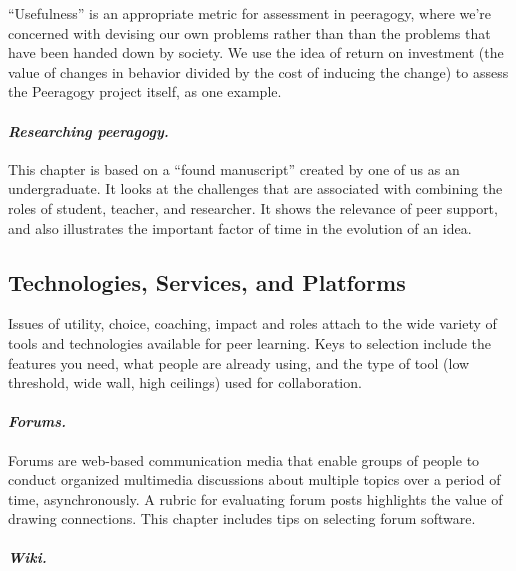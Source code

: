 ``Usefulness'' is an appropriate metric for assessment in peeragogy,
where we're concerned with devising our own problems rather than than
the problems that have been handed down by society. We use the idea of
return on investment (the value of changes in behavior divided by the
cost of inducing the change) to assess the Peeragogy project itself, as
one example.

\hypertarget{researching-peeragogy.}{%
\paragraph{\texorpdfstring{\emph{Researching
peeragogy.}}{Researching peeragogy.}}\label{researching-peeragogy.}}

This chapter is based on a ``found manuscript'' created by one of us as
an undergraduate. It looks at the challenges that are associated with
combining the roles of student, teacher, and researcher. It shows the
relevance of peer support, and also illustrates the important factor of
time in the evolution of an idea.

\hypertarget{technologies-services-and-platforms}{%
\subsection{Technologies, Services, and
Platforms}\label{technologies-services-and-platforms}}

Issues of utility, choice, coaching, impact and roles attach to the wide
variety of tools and technologies available for peer learning. Keys to
selection include the features you need, what people are already using,
and the type of tool (low threshold, wide wall, high ceilings) used for
collaboration.

\hypertarget{forums.}{%
\paragraph{\texorpdfstring{\emph{Forums.}}{Forums.}}\label{forums.}}

Forums are web-based communication media that enable groups of people to
conduct organized multimedia discussions about multiple topics over a
period of time, asynchronously. A rubric for evaluating forum posts
highlights the value of drawing connections. This chapter includes tips
on selecting forum software.

\hypertarget{wiki.}{%
\paragraph{\texorpdfstring{\emph{Wiki.}}{Wiki.}}\label{wiki.}}

